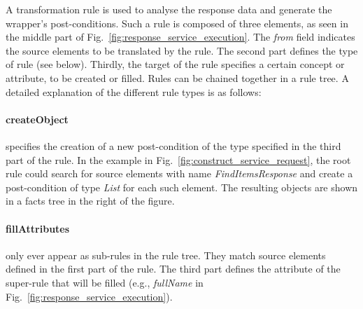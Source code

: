 A transformation rule is used to analyse the response data and generate the wrapper's post-conditions. Such a rule is composed of three elements, as seen in the middle part of Fig.~\ref{fig:response_service_execution}. The \textit{from} field indicates the source elements to be translated by the rule. The second part defines the type of rule (see below). Thirdly, the target of the rule specifies a certain concept or attribute, to be created or filled. Rules can be chained together in a rule tree. A detailed explanation of the different rule types is as follows:

\paragraph{createObject} %
\label{par:createobject}

specifies the creation of a new post-condition of the type specified in the third part of the rule. In the example in Fig.~\ref{fig:construct_service_request}, the root rule could search for source elements with name \emph{FindItemsResponse} and create a post-condition of type \emph{List} for each such element. The resulting objects are shown in a facts tree in the right of the figure.


\paragraph{fillAttributes} %
\label{par:fillattributes}

only ever appear as sub-rules in the rule tree. They match source elements defined in the first part of the rule. The third part defines the attribute of the super-rule that will be filled (e.g., \emph{fullName} in Fig.~\ref{fig:response_service_execution}).

